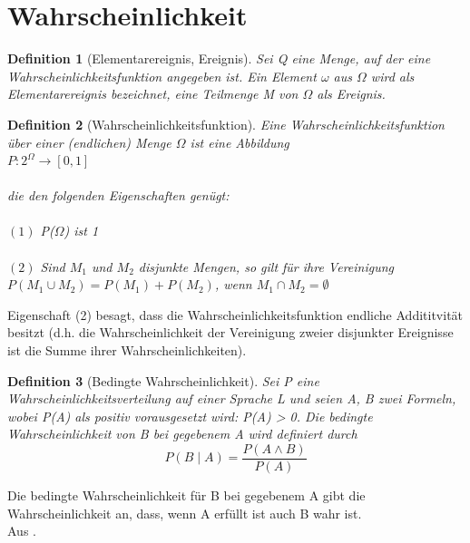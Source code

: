 \documentclass[a4paper, 11pt]{book}
\newtheorem{Def}{Definition }[section]
\begin{document}
\section{Wahrscheinlichkeit} 


\begin{Def}[Elementarereignis, Ereignis] 
Sei Q eine Menge, auf der eine Wahrscheinlichkeitsfunktion angegeben ist. Ein Element $\omega$ aus $\Omega$ wird als Elementarereignis bezeichnet, eine Teilmenge M von $\Omega$ als Ereignis.\\
\end{Def}

\begin{Def}[Wahrscheinlichkeitsfunktion] 
Eine Wahrscheinlichkeitsfunktion über einer (endlichen) Menge $\Omega$ ist eine Abbildung\\

$P : 2^{\Omega} \rightarrow [0, 1] $\\
\\die den folgenden Eigenschaften genügt:\\
\\$ (1 )$ P($\Omega$) ist 1\\
\\$ (2) $ Sind $M_{1}$ und $M_{2}$ disjunkte Mengen, so gilt für ihre Vereinigung\\

$P(M_{1} \cup M_{2}) = P(M_{1}) + P(M_{2})$, wenn $M_{1} \cap M_{2} = \emptyset$
\end{Def}   
Eigenschaft (2) besagt, dass die Wahrscheinlichkeitsfunktion endliche Addititvität besitzt (d.h. die Wahrscheinlichkeit der Vereinigung zweier disjunkter Ereignisse ist die Summe ihrer Wahrscheinlichkeiten).\\

\begin{Def}[Bedingte Wahrscheinlichkeit] \label{sec: bed Wahr}
Sei P eine Wahrscheinlichkeitsverteilung auf einer Sprache L und seien A, B zwei Formeln, wobei P(A) als positiv vorausgesetzt wird: P(A) > 0. Die bedingte Wahrscheinlichkeit von B bei gegebenem A wird definiert durch\\
\[P( B\mid A ) = \frac{P(A\wedge B)}{P(A)}\]

\end{Def}
Die bedingte Wahrscheinlichkeit für B bei gegebenem A gibt die Wahrscheinlichkeit an, dass, wenn A erfüllt ist auch B wahr ist.\\
Aus \cite{BKI08}.
\newpage
\end{document}
